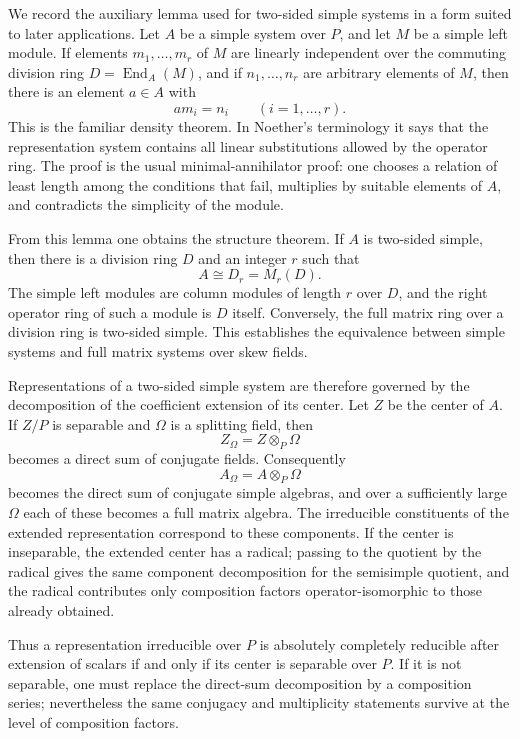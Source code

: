 \documentclass[12pt]{article}
\begin{document}
We record the auxiliary lemma used for two-sided simple systems in a form suited to later applications. Let \(A\) be a simple system over \(P\), and let \(M\) be a simple left module. If elements \(m_1,
\ldots,m_r\) of \(M\) are linearly independent over the commuting division ring \(D=\operatorname{End}_A(M)\), and if \(n_1,
\ldots,n_r\) are arbitrary elements of \(M\), then there is an element \(a\in A\) with
\[
  a m_i=n_i\qquad(i=1,
\ldots,r).
\]
This is the familiar density theorem. In Noether's terminology it says that the representation system contains all linear substitutions allowed by the operator ring. The proof is the usual minimal-annihilator proof: one chooses a relation of least length among the conditions that fail, multiplies by suitable elements of \(A\), and contradicts the simplicity of the module.

From this lemma one obtains the structure theorem. If \(A\) is two-sided simple, then there is a division ring \(D\) and an integer \(r\) such that
\[
  A\cong D_{r}=M_r(D).
\]
The simple left modules are column modules of length \(r\) over \(D\), and the right operator ring of such a module is \(D\) itself. Conversely, the full matrix ring over a division ring is two-sided simple. This establishes the equivalence between simple systems and full matrix systems over skew fields.

Representations of a two-sided simple system are therefore governed by the decomposition of the coefficient extension of its center. Let \(Z\) be the center of \(A\). If \(Z/P\) is separable and \(\Omega\) is a splitting field, then
\[
  Z_\Omega=Z\otimes_P\Omega
\]
becomes a direct sum of conjugate fields. Consequently
\[
  A_\Omega=A\otimes_P\Omega
\]
becomes the direct sum of conjugate simple algebras, and over a sufficiently large \(\Omega\) each of these becomes a full matrix algebra. The irreducible constituents of the extended representation correspond to these components. If the center is inseparable, the extended center has a radical; passing to the quotient by the radical gives the same component decomposition for the semisimple quotient, and the radical contributes only composition factors operator-isomorphic to those already obtained.

Thus a representation irreducible over \(P\) is absolutely completely reducible after extension of scalars if and only if its center is separable over \(P\). If it is not separable, one must replace the direct-sum decomposition by a composition series; nevertheless the same conjugacy and multiplicity statements survive at the level of composition factors.
\end{document}
